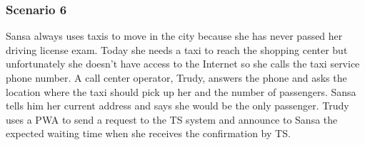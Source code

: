 \subsubsection{Scenario 6}

Sansa always uses taxis to move in the city because she has never
passed her driving license exam. Today she needs a taxi to reach the
shopping center but unfortunately she doesn't have access to the Internet
so she calls the taxi service phone number. A call center operator,
Trudy, answers the phone and asks the location where the taxi should
pick up her and the number of passengers. Sansa tells him her current
address and says she would be the only passenger. Trudy uses a PWA
to send a request to the TS system and announce to Sansa the expected
waiting time when she receives the confirmation by TS. 
